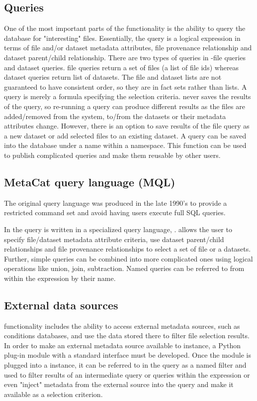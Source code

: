 \documentclass[../main-v1.tex]{subfiles}
\begin{document}
\subsection{Queries} 
One of the most important parts of the  functionality is the ability to query the database for "interesting" files. Essentially, the query is a logical expression in terms of file and/or dataset metadata attributes, file provenance relationship and dataset parent/child relationship. There are two types of queries in  -file queries and dataset queries. file queries return a set of files (a list of file ids) whereas dataset queries return list of datasets. The file and dataset lists are not guaranteed to have consistent order, so they are in fact sets rather than lists. 
A query is merely a formula specifying the selection criteria.  never saves the results of the query, so re-running a query can produce different results as the files are added/removed from the system, to/from the datasets or their metadata attributes change. However, there is an option to save results of the file query as a new dataset or add selected files to an existing dataset. 
A query can be saved into the database under a name within a namespace. This function can be used to publish complicated queries and make them reusable by other users. 

\subsection{MetaCat query language (MQL)}
The original  query language was produced in the late 1990's to provide a restricted command set and  avoid having users execute full SQL queries.

In   the query is written in a specialized query language, .  allows the user to specify file/dataset metadata attribute criteria, use dataset parent/child relationships and file provenance relationships to select a set of file or a datasets. Further, simple queries can be combined into more complicated ones using logical operations like union, join, subtraction. Named queries can be referred to from within the  expression by their name. 

\subsection{External data sources }
   functionality includes the ability to access external metadata sources, such as conditions databases, and use the data stored there to filter file selection results. In order to make an external metadata source available to  instance,  a Python plug-in module with a standard interface must be developed.  Once the module is plugged into a  instance, it can be referred to in the  query as a named filter  and used to filter results of an intermediate query or queries within the  expression or even "inject" metadata from the external source into the query and make it available as a  selection criterion. 
\end{document}
